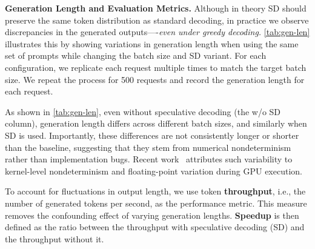 \textbf{Generation Length and Evaluation Metrics.}
Although in theory SD should preserve the same token distribution as standard decoding, in practice we observe discrepancies in the generated outputs—-{\em even under greedy decoding.} \autoref{tab:gen-len} illustrates this by showing variations in generation length when using the same set of prompts while changing the batch size and SD variant.
For each configuration, we replicate each request multiple times to match the target batch size.
We repeat the process for 500 requests and record the generation length for each request.
\begin{table}[h]
\centering
\caption{Average generation length (mean $\pm$ standard deviation) of the baseline (w/o SD) and different SD variants on the ShareGPT dataset using Llama3.1-8B across varying batch sizes.}
\label{tab:gen-len}
\end{table}

As shown in \autoref{tab:gen-len}, even without speculative decoding (the w/o SD column), generation length differs across different batch sizes, and similarly when SD is used. Importantly, these differences are not consistently longer or shorter than the baseline, suggesting that they stem from numerical nondeterminism rather than implementation bugs.
Recent work~\cite{he2025nondeterminism} attributes such variability to kernel-level nondeterminism and floating-point variation during GPU execution.

To account for fluctuations in output length, we use token \textbf{throughput}, i.e., the number of generated tokens per second, as the performance metric.
This measure removes the confounding effect of varying generation lengths. \textbf{Speedup} is then defined as the ratio between the throughput with speculative decoding (SD) and the throughput without it.

